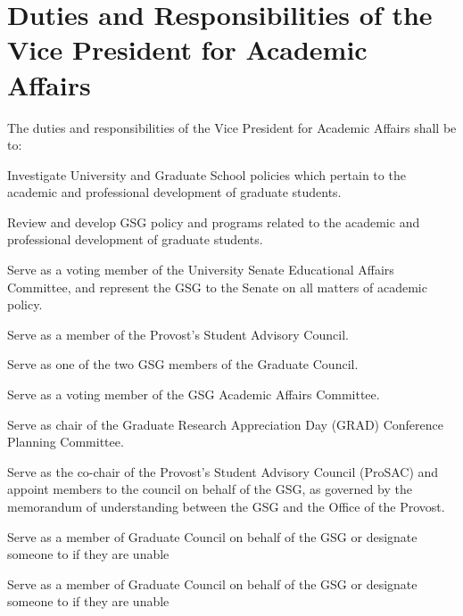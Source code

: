 \section{Duties and Responsibilities of the Vice President for Academic Affairs}
The duties and responsibilities of the Vice President for Academic Affairs shall be to:
\begin{bylaws-number}
  \item Investigate University and Graduate School policies which pertain to the academic and professional development of graduate students.
  \item Review and develop GSG policy and programs related to the academic and professional development of graduate students.
  \item Serve as a voting member of the University Senate Educational Affairs Committee, and represent the GSG to the Senate on all matters of academic policy.
  \item Serve as a member of the Provost’s Student Advisory Council.
  \item Serve as one of the two GSG members of the Graduate Council.
  \item Serve as a voting member of the GSG Academic Affairs Committee.
  \item Serve as chair of the Graduate Research Appreciation Day (GRAD) Conference Planning Committee.
  \item Serve as the co-chair of the Provost’s Student Advisory Council (ProSAC) and appoint members to the council on behalf of the GSG, as governed by the memorandum of understanding between the GSG and the Office of the Provost.
  \item Serve as a member of Graduate Council on behalf of the GSG or designate someone to if they are unable
  \item Serve as a member of Graduate Council on behalf of the GSG or designate someone to if they are unable
\end{bylaws-number}

